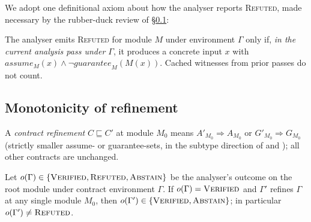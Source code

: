 We adopt one definitional axiom about how the analyser reports
\textsc{Refuted}, made necessary by the rubber-duck review of
\S\ref{sec:ag:monotonicity}:

\begin{axiom}
\label{ax:refuted}
The analyser emits \textsc{Refuted} for module $M$ under environment
$\Gamma$ only if, \emph{in the current analysis pass under $\Gamma$},
it produces a concrete input $x$ with
$\mathit{assume}_M(x) \wedge \neg\mathit{guarantee}_M(M(x))$.
Cached witnesses from prior passes do not count.
\end{axiom}

\subsection{Monotonicity of refinement}
\label{sec:ag:monotonicity}

A \emph{contract refinement} $C\sqsubseteq C'$ at module $M_0$ means
$A'_{M_0}\!\Rightarrow\!A_{M_0}$ or $G'_{M_0}\!\Rightarrow\!G_{M_0}$
(strictly smaller assume- or guarantee-sets, in the subtype direction
of \citet{vazou2014refinement} and \citet{swamy2016dependent}); all
other contracts are unchanged.

\begin{theorem}[Monotonicity]
\label{thm:monotonicity}
Let $o(\Gamma)\in\{\textsc{Verified},\textsc{Refuted},\textsc{Abstain}\}$
be the analyser's outcome on the root module under contract environment
$\Gamma$.  If $o(\Gamma)=\textsc{Verified}$ and $\Gamma'$ refines
$\Gamma$ at any single module $M_0$, then
$o(\Gamma')\in\{\textsc{Verified},\textsc{Abstain}\}$;
in particular $o(\Gamma')\neq\textsc{Refuted}$.
\end{theorem}

